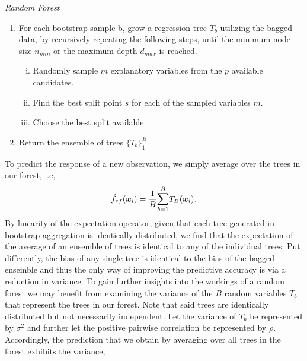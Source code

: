 \documentclass[a4paper,12pt, headsepline]{scrartcl}
\numberwithin{equation}{section}
\begin{document}

{}
{\centering
\begin{minipage}{.9\linewidth}
	\begin{algorithm}[H]
		\caption{\textit{Random Forest}}\label{alg:one}
		\begin{enumerate}
			\item For each bootstrap sample b, grow a regression tree $T_b$ utilizing the bagged data, by recursively repeating the following steps, until the minimum node size $n_{min}$ or the maximum depth $d_{max}$ is reached.
			\begin{enumerate}[i.]
				\item Randomly sample $m$ explanatory variables from the $p$ available candidates.
				\item Find the best split point $s$ for each of the sampled variables $m$.
				\item Choose the best split available.
			\end{enumerate}
			\item Return the ensemble of trees $\{T_b\}_1^B$
		\end{enumerate}
	\end{algorithm}
\end{minipage}
\par
}
To predict the response of a new observation, we simply average over the trees in our forest, i.e,
\[
\hat f_{rf}(\bm x_i) = \frac{1}{B} \mathlarger{\sum}\limits_{b = 1}^B T_B(\bm x_i).
\]
 By linearity of the expectation operator, given that each tree generated in bootstrap aggregation is identically distributed, we find that the expectation of the average of an ensemble of trees is identical to any of the individual trees. Put differently, the bias of any single tree is identical to the bias of the bagged ensemble and thus the only way of improving the predictive accuracy is via a reduction in variance.
 To gain further insights into the workings of a random forest we may benefit from examining the variance of the $B$ random variables $T_b$ that represent the trees in our forest. Note that said trees are identically distributed but not necessarily independent. Let the variance of $T_b$ be represented by $\sigma^2$ and further let the positive pairwise correlation be represented by $\rho$. Accordingly, the prediction that we obtain by averaging over all trees in the forest exhibits the variance, 
\end{document}
